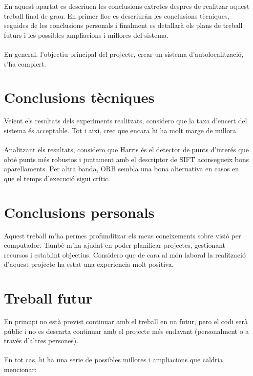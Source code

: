 En aquest apartat es descriuen les conclusions extretes despres de realitzar aquest treball final de grau. En primer lloc es descriuràn les conclusions tècniques, seguides de les conclusions personals
i finalment es detallarà els plans de treball futurs i les possibles ampliacions i millores del sistema.\\\\
En general, l'objectiu principal del projecte, crear un sistema d'autolocalització, s'ha complert.

\section{Conclusions tècniques}
	Veient els resultats dels experiments realitzats, considero que la taxa d'encert del sistema és acceptable. Tot i així, crec que encara hi ha molt marge de millora.\\\\
	Analitzant els resultats, considero que Harris és el detector de punts d'interés que obté punts més robustos i juntament amb el descriptor de SIFT aconsegueix bons aparellaments. Per altra banda,
	ORB sembla una bona alternativa en casos en que el temps d'execució sigui crític.
\section{Conclusions personals}
	Aquest treball m'ha permes profunditzar els meus coneixements sobre visió per computador. També m'ha ajudat en poder planificar projectes, gestionant recursos i establint objectius.
	Considero que de cara al món laboral la realització d'aquest projecte ha estat una experiencia molt positiva.

\newpage
\section{Treball futur}
	En principi no està previst continuar amb el treball en un futur, pero el codi serà públic i no es descarta continuar amb el projecte més endavant (personalment o a través d'altres persones).\\\\
	En tot cas, hi ha una serie de possibles millores i ampliacions que caldria mencionar:\\

